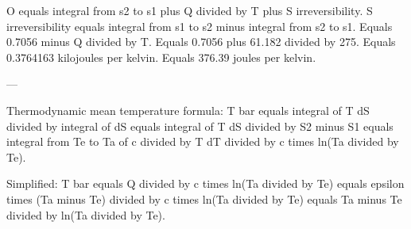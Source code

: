 O equals integral from s2 to s1 plus Q divided by T plus S irreversibility.  
S irreversibility equals integral from s1 to s2 minus integral from s2 to s1.  
Equals 0.7056 minus Q divided by T.  
Equals 0.7056 plus 61.182 divided by 275.  
Equals 0.3764163 kilojoules per kelvin.  
Equals 376.39 joules per kelvin.

---

Thermodynamic mean temperature formula:  
T bar equals integral of T dS divided by integral of dS equals integral of T dS divided by S2 minus S1 equals integral from Te to Ta of c divided by T dT divided by c times ln(Ta divided by Te).  

Simplified:  
T bar equals Q divided by c times ln(Ta divided by Te) equals epsilon times (Ta minus Te) divided by c times ln(Ta divided by Te) equals Ta minus Te divided by ln(Ta divided by Te).